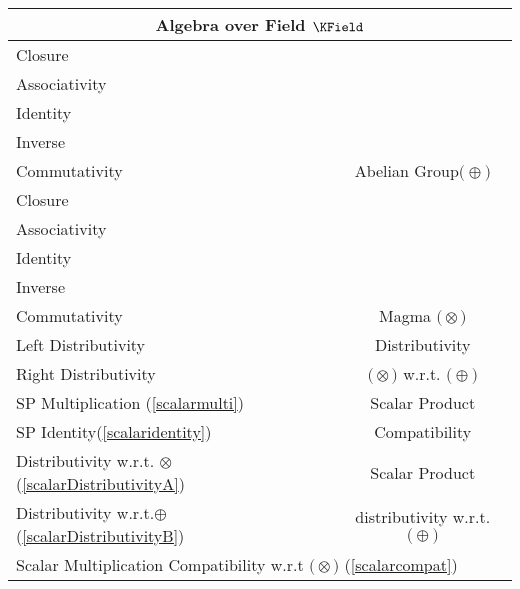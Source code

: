 \documentclass[a4paper,12pt]{scrartcl}
\newcommand{\OpA}{\otimes}
\newcommand{\OpB}{\oplus}
\begin{document}
\begin{minipage}[c]{0,5\textwidth}

\begin{tabular}{|l|c|} %
  \hline
  \multicolumn{2}{c}{\cellcolor{green!25}Algebra over Field $\KField$} \\
  \hline
    \cellcolor{blue!25} \footnotesize Closure& \cellcolor{yellow!25}  \\
    \cellcolor{blue!25} \footnotesize Associativity& \cellcolor{yellow!25}  \\
    \cellcolor{blue!25} \footnotesize Identity& \cellcolor{yellow!25} \\
    \cellcolor{blue!25} \footnotesize Inverse& \cellcolor{yellow!25} \\
    \cellcolor{blue!25} \footnotesize Commutativity& \multirow{-5}{*}{\tiny\cellcolor{yellow!25}Abelian Group$\big(\OpB\big)$} \\
   \hline
    \cellcolor{blue!25} \footnotesize Closure& \cellcolor{yellow!25}  \\
    \cellcolor{red!25} \footnotesize Associativity& \cellcolor{yellow!25}  \\
    \cellcolor{red!25} \footnotesize Identity& \cellcolor{yellow!25} \\
    \cellcolor{red!25} \footnotesize Inverse& \cellcolor{yellow!25} \\
    \cellcolor{red!25} \footnotesize Commutativity& \multirow{-5}{*}{\tiny\cellcolor{yellow!25} Magma $\big(\OpA\big)$} \\
  \hline
  	\cellcolor{blue!25} \footnotesize Left Distributivity&  \tiny\cellcolor{yellow!25}Distributivity\\
    \cellcolor{blue!25} \footnotesize Right Distributivity & \tiny\cellcolor{yellow!25} $\big(\OpA\big)$ w.r.t. $\big(\OpB\big)$  \\
   \hline
  \hline
     \cellcolor{blue!25} \footnotesize SP Multiplication (\ref{scalarmulti})&  \tiny\cellcolor{yellow!25}Scalar Product\\
    \cellcolor{blue!25} \footnotesize SP Identity(\ref{scalaridentity}) & \tiny\cellcolor{yellow!25} Compatibility  \\
   \hline 
    \cellcolor{blue!25} \footnotesize Distributivity w.r.t. $\OpA$ (\ref{scalarDistributivityA})&  \tiny\cellcolor{yellow!25}Scalar Product\\
    \cellcolor{blue!25} \footnotesize Distributivity w.r.t.$\OpB$ (\ref{scalarDistributivityB}) & \tiny\cellcolor{yellow!25} distributivity w.r.t. $\big(\OpB\big)$  \\
   \hline
    \multicolumn{2}{l}{\footnotesize \cellcolor{blue!25} Scalar Multiplication Compatibility w.r.t  $\big(\OpA\big)$ (\ref{scalarcompat})}\\
   \hline
\end{tabular}


\end{minipage}
\end{document}
